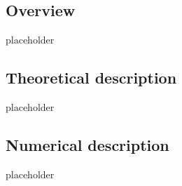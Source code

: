 \subsection{Overview}
        placeholder
\subsection{Theoretical description}
        placeholder
\subsection{Numerical description}
        placeholder